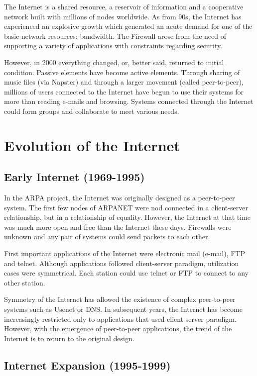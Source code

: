 The Internet is a shared resource, a reservoir of information and a cooperative
network built with millions of nodes worldwide. As from 90s, the Internet has
experienced an explosive growth which generated an acute demand for one of the
basic network resources: bandwidth. The Firewall arose from the need of
supporting a variety of applications with constraints regarding security.

However, in 2000 everything changed, or, better said, returned to initial
condition. Passive elements have become active elements. Through sharing of
music files (via Napster) and through a larger movement (called peer-to-peer),
millions of users connected to the Internet have begun to use their systems for
more than reading e-mails and browsing. Systems connected through the Internet
could form groups and collaborate to meet various needs.

\section{Evolution of the Internet}
\label{sec:p2p-systems:evolution-internet}

\subsection{Early Internet (1969-1995)}

In the ARPA project, the Internet was originally designed as a peer-to-peer
system. The first few nodes of ARPANET were nod connected in a client-server
relationship, but in a relationship of equality. However, the Internet at that
time was much more open and free than the Internet these days. Firewalls were
unknown and any pair of systems could send packets to each other.

First important applications of the Internet were electronic mail (e-mail), FTP
and telnet. Although applications followed client-server paradigm, utilization
cases were symmetrical. Each station could use telnet or FTP to connect to any
other station.

Symmetry of the Internet has allowed the existence of complex peer-to-peer
systems such as Usenet or DNS. In subsequent years, the Internet has become
increasingly restricted only to applications that used client-server paradigm.
However, with the emergence of peer-to-peer applications, the trend of the
Internet is to return to the original design.

\subsection{Internet Expansion (1995-1999)}

